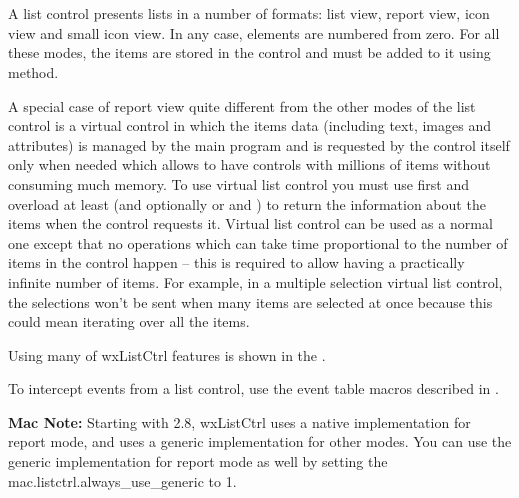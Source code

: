 
\section{}\label{wxlistctrl}

A list control presents lists in a number of formats: list view, report view,
icon view and small icon view. In any case, elements are numbered from zero.
For all these modes, the items are stored in the control and must be added to
it using  method.

A special case of report view quite different from the other modes of the list
control is a virtual control in which the items data (including text, images
and attributes) is managed by the main program and is requested by the control
itself only when needed which allows to have controls with millions of items
without consuming much memory. To use virtual list control you must use
 first and overload at least
 (and optionally
 or  and
) to return the information
about the items when the control requests it. Virtual list control can be used
as a normal one except that no operations which can take time proportional to
the number of items in the control happen -- this is required to allow having a
practically infinite number of items. For example, in a multiple selection
virtual list control, the selections won't be sent when many items are selected
at once because this could mean iterating over all the items.

Using many of wxListCtrl features is shown in the
.

To intercept events from a list control, use the event table macros described
in .

{\bf Mac Note:} Starting with 2.8, wxListCtrl uses a native implementation for 
report mode, and uses a generic implementation for other modes. You can use the
generic implementation for report mode as well by setting the
mac.listctrl.always\_use\_generic  to
1.

